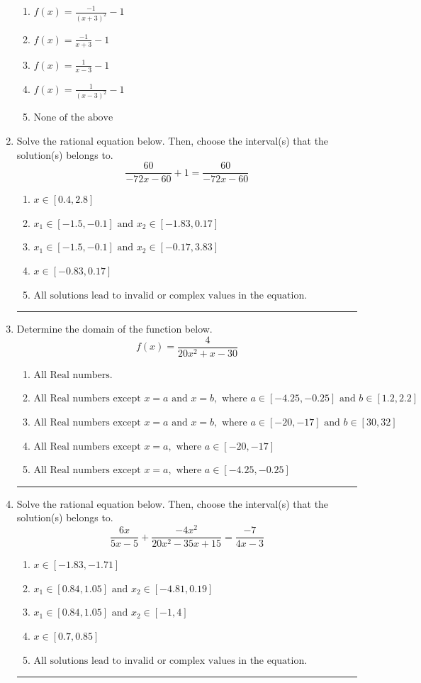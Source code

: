 \documentclass[14pt]{extbook}
\newcommand{\litem}[1]{\item#1\hspace*{-1cm}\rule{\textwidth}{0.4pt}}
\begin{document}
\begin{enumerate}
{\begin{center}
\end{center}
\begin{enumerate}[label=\Alph*.]
\item \( f(x) = \frac{-1}{(x + 3)^2} - 1 \)
\item \( f(x) = \frac{-1}{x + 3} - 1 \)
\item \( f(x) = \frac{1}{x - 3} - 1 \)
\item \( f(x) = \frac{1}{(x - 3)^2} - 1 \)
\item \( \text{None of the above} \)

\end{enumerate} }
\litem{
Solve the rational equation below. Then, choose the interval(s) that the solution(s) belongs to.\[ \frac{60}{-72x -60} + 1 = \frac{60}{-72x -60} \]\begin{enumerate}[label=\Alph*.]
\item \( x \in [0.4,2.8] \)
\item \( x_1 \in [-1.5, -0.1] \text{ and } x_2 \in [-1.83,0.17] \)
\item \( x_1 \in [-1.5, -0.1] \text{ and } x_2 \in [-0.17,3.83] \)
\item \( x \in [-0.83,0.17] \)
\item \( \text{All solutions lead to invalid or complex values in the equation.} \)

\end{enumerate} }
\litem{
Determine the domain of the function below.\[ f(x) = \frac{4}{20x^{2} +x -30} \]\begin{enumerate}[label=\Alph*.]
\item \( \text{All Real numbers.} \)
\item \( \text{All Real numbers except } x = a \text{ and } x = b, \text{ where } a \in [-4.25, -0.25] \text{ and } b \in [1.2, 2.2] \)
\item \( \text{All Real numbers except } x = a \text{ and } x = b, \text{ where } a \in [-20, -17] \text{ and } b \in [30, 32] \)
\item \( \text{All Real numbers except } x = a, \text{ where } a \in [-20, -17] \)
\item \( \text{All Real numbers except } x = a, \text{ where } a \in [-4.25, -0.25] \)

\end{enumerate} }
\litem{
Solve the rational equation below. Then, choose the interval(s) that the solution(s) belongs to.\[ \frac{6x}{5x -5} + \frac{-4x^{2}}{20x^{2} -35 x + 15} = \frac{-7}{4x -3} \]\begin{enumerate}[label=\Alph*.]
\item \( x \in [-1.83,-1.71] \)
\item \( x_1 \in [0.84, 1.05] \text{ and } x_2 \in [-4.81,0.19] \)
\item \( x_1 \in [0.84, 1.05] \text{ and } x_2 \in [-1,4] \)
\item \( x \in [0.7,0.85] \)
\item \( \text{All solutions lead to invalid or complex values in the equation.} \)


\end{enumerate}}
\end{enumerate}
\end{document}
